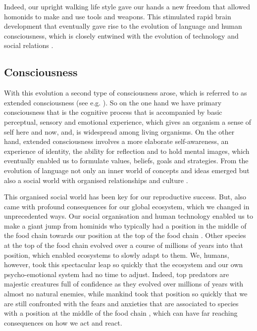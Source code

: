 \documentclass[
  11pt,
]{book}
\begin{document}
Indeed, our upright walking life style gave our hands a new freedom that allowed homonids to make and use tools and weapons. This stimulated rapid brain development that eventually gave rise to the evolution of language and human consciousness, which is closely entwined with the evolution of technology and social relations \citep{capraLuisi2014}.

\hypertarget{consciousness}{%
\subsection{Consciousness}\label{consciousness}}

With this evolution a second type of consciousness arose, which is referred to as extended consciousness (see e.g. \citet{capraLuisi2014}). So on the one hand we have primary consciousness that is the cognitive process that is accompanied by basic perceptual, sensory and emotional experience, which gives an organism a sense of self here and now, and, is widespread among living organisms. On the other hand, extended consciousness involves a more elaborate self-awareness, an experience of identity, the ability for reflection and to hold mental images, which eventually enabled us to formulate values, beliefs, goals and strategies. From the evolution of language not only an inner world of concepts and ideas emerged but also a social world with organised relationships and culture \citep{capraLuisi2014}.

This organised social world has been key for our reproductive success. But, also came with profound consequences for our global ecosystem, which we changed in unprecedented ways. Our social organisation and human technology enabled us to make a giant jump from hominids who typically had a position in the middle of the food chain towards our position at the top of the food chain \citep{Harari2015}. Other species at the top of the food chain evolved over a course of millions of years into that position, which enabled ecosystems to slowly adapt to them. We, humans, however, took this spectacular leap so quickly that the ecosystem and our own psycho-emotional system had no time to adjust. Indeed, top predators are majestic creatures full of confidence as they evolved over millions of years with almost no natural enemies, while mankind took that position so quickly that we are still confronted with the fears and anxieties that are associated to species with a position at the middle of the food chain \citep{Harari2015}, which can have far reaching consequences on how we act and react.
\end{document}
